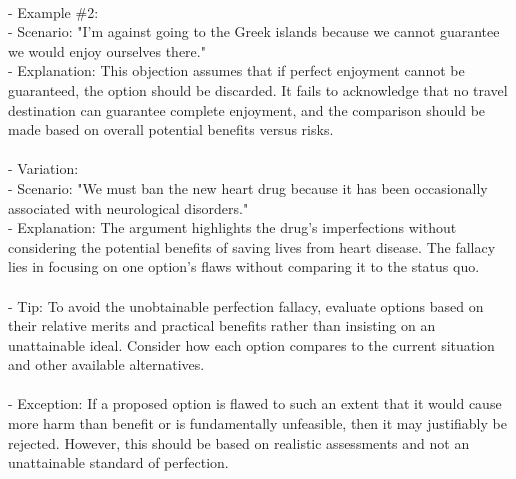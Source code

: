 \documentclass[a4paper,12pt,single,pdftex]{scrbook}
\begin{document}
    
      
    \\

    
      - Example \#2:
    \\

    
        - Scenario: "I'm against going to the Greek islands because we cannot guarantee we would enjoy ourselves there."
    \\

    
        - Explanation: This objection assumes that if perfect enjoyment cannot be guaranteed, the option should be discarded. It fails to acknowledge that no travel destination can guarantee complete enjoyment, and the comparison should be made based on overall potential benefits versus risks.
    \\

    
      
    \\

    
      - Variation:
    \\

    
        - Scenario: "We must ban the new heart drug because it has been occasionally associated with neurological disorders."
    \\

    
        - Explanation: The argument highlights the drug's imperfections without considering the potential benefits of saving lives from heart disease. The fallacy lies in focusing on one option's flaws without comparing it to the status quo.
    \\

    
      
    \\

    
      - Tip: To avoid the unobtainable perfection fallacy, evaluate options based on their relative merits and practical benefits rather than insisting on an unattainable ideal. Consider how each option compares to the current situation and other available alternatives.
    \\

    
      
    \\

    
      - Exception: If a proposed option is flawed to such an extent that it would cause more harm than benefit or is fundamentally unfeasible, then it may justifiably be rejected. However, this should be based on realistic assessments and not an unattainable standard of perfection.
    \\
\end{document}

